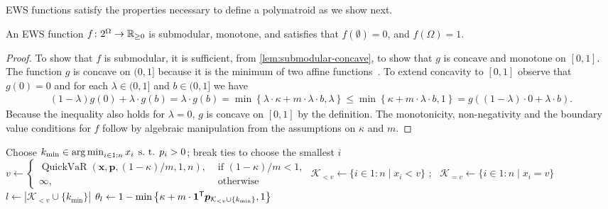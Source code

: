 EWS functions satisfy the properties necessary to define a polymatroid as we show next.
\begin{proposition}
An EWS function $f\colon 2^{\Omega} \to  \mathbb{R}_{\ge 0}$ is submodular, monotone, and satisfies that $f(\emptyset) = 0$, and $f(\Omega) = 1$.
\end{proposition}
\begin{proof} 
To show that $f$ is submodular, it is sufficient, from \cref{lem:submodular-concave}, to show that $g$ is concave and monotone on $[0,1]$. The function $g$ is concave on $(0, 1]$ because it is the minimum of two affine functions~\cite{boyd2004convex}. To extend concavity to $[0,1]$ observe that $g(0) = 0$ and for each $\lambda \in (0,1]$ and $b \in ( 0, 1]$ we have
\begin{align*}
  (1 - \lambda)g(0) + \lambda \cdot g(b)
  = \lambda \cdot g(b)
  = \min\left\{\lambda  \cdot \kappa + m\cdot \lambda\cdot b, \lambda\right\} 
  \leq \min \left\{ \kappa + m \cdot \lambda \cdot b, 1 \right\}
  = g\left( (1 - \lambda)\cdot 0 + \lambda\cdot b\right).
\end{align*}
Because the inequality also holds for $\lambda = 0$, $g$ is concave on $[0,1]$ by the definition. The monotonicity, non-negativity and the boundary value conditions for $f$ follow by algebraic manipulation from the assumptions on $\kappa$ and
$m$.
\end{proof}

\begin{algorithm}
  \caption{\texttt{QuickDivergence}: Linear minimization over EWS polymatroids.} \label{alg:maximum-weight-independent}
  Choose $k_{\min} \in \operatorname*{arg\,min}_{i \in  1{:}n} x_i \; \operatorname{s.\,t.}\; p_i > 0$; break ties to choose the smallest $i$ 
    $v \gets
    \begin{cases}
      \operatorname{QuickVaR}(\bm{x}, \bm{p}, (1 - \kappa)/m, 1, n), &\text{ if } (1-\kappa) / m < 1, \\
      \infty, &\text{ otherwise}
    \end{cases}
     $\;
  $\mathcal{K}_{< v} \gets \{ i \in  1{:}n \mid x_i < v \}$ ;~
  $\mathcal{K}_{= v} \gets \{ i \in 1{:}n \mid x_i = v \}$ \;
  $l \gets |\mathcal{K}_{< v} \cup \{ k_{\min} \} |$\;
  $\theta_l \gets  1 - \min \left\{ \kappa + m\cdot \bm{1}^{\mathsf{T}} \bm{p}_{\mathcal{K}_{<v} \cup \{k_{\min}\} }, 1 \right\}$ \;
 \end{algorithm}

